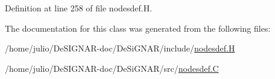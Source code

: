 Definition at line 258 of file nodesdef.\+H.



The documentation for this class was generated from the following files\+:\begin{DoxyCompactItemize}
\item 
/home/julio/\+De\+S\+I\+G\+N\+A\+R-\/doc/\+De\+Si\+G\+N\+A\+R/include/\hyperlink{nodesdef_8_h}{nodesdef.\+H}\item 
/home/julio/\+De\+S\+I\+G\+N\+A\+R-\/doc/\+De\+Si\+G\+N\+A\+R/src/\hyperlink{nodesdef_8_c}{nodesdef.\+C}\end{DoxyCompactItemize}
